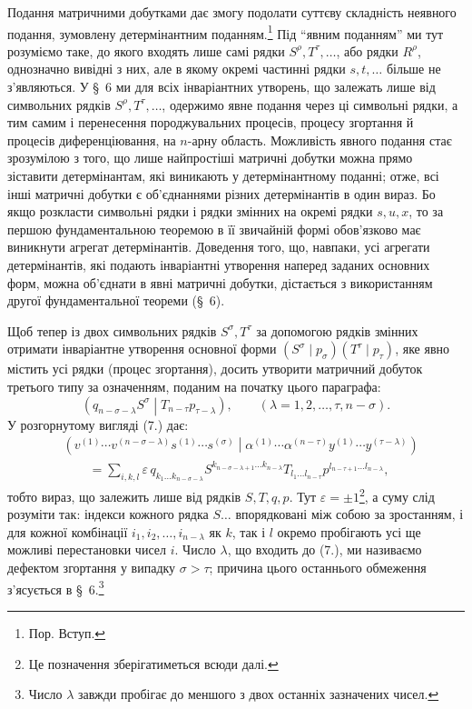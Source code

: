 \documentclass[11pt]{article}
\newcommand{\pair}[2]{\left(#1\middle|#2\right)}
\newcommand{\eps}{\varepsilon}
\begin{document}
Подання матричними добутками дає змогу подолати суттєву складність неявного подання, зумовлену детермінантним поданням.\footnote{Пор. Вступ.} Під ``явним поданням'' ми тут розуміємо таке, до якого входять лише самі рядки $S^\rho,T^\tau,\ldots$, або рядки $R^\rho$, однозначно вивідні з них, але в якому окремі частинні рядки $s,t,\ldots$ більше не з'являються. У \S\ 6 ми для всіх інваріантних утворень, що залежать лише від символьних рядків $S^\rho,T^\tau,\ldots$, одержимо явне подання через ці символьні рядки, а тим самим і перенесення породжувальних процесів, процесу згортання й процесів диференціювання, на $n$-арну область. Можливість явного подання стає зрозумілою з того, що лише найпростіші матричні добутки можна прямо зіставити детермінантам, які виникають у детермінантному поданні; отже, всі інші матричні добутки є об'єднаннями різних детермінантів в один вираз. Бо якщо розкласти символьні рядки і рядки змінних на окремі рядки $s,u,x$, то за першою фундаментальною теоремою в її звичайній формі обов'язково має виникнути агрегат детермінантів. Доведення того, що, навпаки, усі агрегати детермінантів, які подають інваріантні утворення наперед заданих основних форм, можна об'єднати в явні матричні добутки, дістається з використанням другої фундаментальної теореми (\S\ 6).

Щоб тепер із двох символьних рядків $S^\sigma,T^\tau$ за допомогою рядків змінних отримати інваріантне утворення основної форми $(S^\sigma\mid p_\sigma)(T^\tau\mid p_\tau)$, яке явно містить усі рядки (процес згортання), досить утворити матричний добуток третього типу за означенням, поданим на початку цього параграфа:
\begin{equation}
 \pair{q_{n-\sigma-\lambda}S^\sigma}{T_{n-\tau}p_{\tau-\lambda}},
 \qquad (\lambda=1,2,\ldots,\tau,n-\sigma).
\tag{7}
\end{equation}
У розгорнутому вигляді (7.) дає:
\begin{equation}
\begin{aligned}
&\pair{v^{(1)}\cdots v^{(n-\sigma-\lambda)}s^{(1)}\cdots s^{(\sigma)}}
       {\alpha^{(1)}\cdots\alpha^{(n-\tau)}y^{(1)}\cdots y^{(\tau-\lambda)}} \\
&\qquad =\sum_{i,k,l}\eps\,q_{k_1\ldots k_{n-\sigma-\lambda}}
 S^{k_{n-\sigma-\lambda+1}\ldots k_{n-\lambda}}
 T_{l_1\ldots l_{n-\tau}}
 p^{l_{n-\tau+1}\ldots l_{n-\lambda}},
\end{aligned}
\tag{8}
\end{equation}
тобто вираз, що залежить лише від рядків $S,T,q,p$. Тут $\eps=\pm1$\footnote{Це позначення зберігатиметься всюди далі.}, а суму слід розуміти так: індекси кожного рядка $S\ldots$ впорядковані між собою за зростанням, і для кожної комбінації $i_1,i_2,\ldots,i_{n-\lambda}$ як $k$, так і $l$ окремо пробігають усі ще можливі перестановки чисел $i$. Число $\lambda$, що входить до (7.), ми називаємо дефектом згортання у випадку $\sigma>\tau$; причина цього останнього обмеження з'ясується в \S\ 6.\footnote{Число $\lambda$ завжди пробігає до меншого з двох останніх зазначених чисел.}
\end{document}
